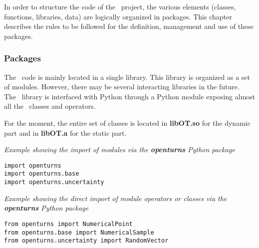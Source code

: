 
In order to structure the code of the \OT\ project, the various elements (classes, functions, libraries, data) are logically organized in packages. This chapter describes the rules to be followed for the definition, management and use of these packages.

\subsubsection{Packages}
The \OT\ code is mainly located in a single library. This library is organized as a set of modules. However, there may be several interacting libraries in the future.\\
The \OT\ library is interfaced with Python through a Python module exposing almost all the \OT\ classes and operators.

For the moment, the entire set of classes is located in {\bf libOT.so} for the dynamic part and in {\bf libOT.a} for the static part.

\emph{Example showing the import of modules via the {\bf openturns} Python package}
\lstset{language=C++, basicstyle=\normalsize}
\begin{lstlisting}[frame=TRBL]
import openturns
import openturns.base
import openturns.uncertainty
\end{lstlisting}

\emph{Example showing the direct import of module operators or classes via the {\bf openturns} Python package}
\lstset{language=C++, basicstyle=\normalsize}
\begin{lstlisting}[frame=TRBL]
from openturns import NumericalPoint
from openturns.base import NumericalSample
from openturns.uncertainty import RandomVector
\end{lstlisting}
